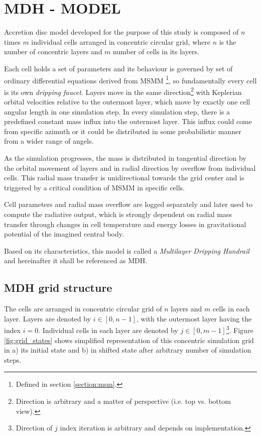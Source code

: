 \chapter{MDH - MODEL}
\thispagestyle{empty}


Accretion disc model developed for the purpose of this study is composed of $n$ times $m$ individual cells arranged in concentric circular grid, where $n$ is the number of concentric layers and $m$ number of cells in its layers.

Each cell holds a set of parameters and its behaviour is governed by set of ordinary differential equations derived from MSMM \footnote{Defined in section \ref{section:msm}.}, so fundamentally every cell is its own \emph{dripping faucet}. Layers move in the same direction\footnote{Direction is arbitrary and a matter of perspective (i.e. top vs. bottom view).} with Keplerian orbital velocities relative to the outermost layer, which move by exactly one cell angular length in one simulation step. In every simulation step, there is a predefined constant mass influx into the outermost layer. This influx could come from specific azimuth or it could be distributed in some probabilistic manner from a wider range of angels.

As the simulation progresses, the mass is distributed in tangential direction by the orbital movement of layers and in radial direction by overflow from individual cells. This radial mass transfer is unidirectional towards the grid center and is triggered by a critical condition of MSMM in specific cells. 

Cell parameters and radial mass overflow are logged separately and later used to compute the radiative output, which is strongly dependent on radial mass transfer through changes in cell temperature and energy losses in gravitational potential of the imagined central body. 

Based on its characteristics, this model is called a \emph{Multilayer Dripping Handrail} and hereinafter it shall be referenced as MDH.

\section{MDH grid structure}

The cells are arranged in concentric circular grid of $n$ layers and $m$ cells in each layer. Layers are denoted by $i \in [0, n-1]$, with the outermost layer having the index $i = 0$. Individual cells in each layer are denoted by $j \in [0, m-1]$\footnote{Direction of $j$ index iteration is arbitrary and depends on implementation.}. Figure \ref{fig:grid_states} shows simplified representation of this concentric simulation grid in a) its initial state and b) in shifted state after arbitrary number of simulation steps. 

